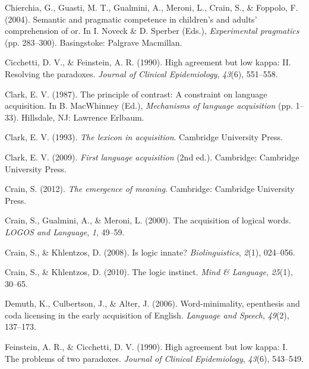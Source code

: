 \documentclass[,man,floatsintext]{apa6}
\begin{document}
\leavevmode\hypertarget{ref-chierchia2004semantic}{}%
Chierchia, G., Guasti, M. T., Gualmini, A., Meroni, L., Crain, S., \& Foppolo, F. (2004). Semantic and pragmatic competence in children's and adults' comprehension of or. In I. Noveck \& D. Sperber (Eds.), \emph{Experimental pragmatics} (pp. 283--300). Basingstoke: Palgrave Macmillan.

\leavevmode\hypertarget{ref-cicchetti1990high}{}%
Cicchetti, D. V., \& Feinstein, A. R. (1990). High agreement but low kappa: II. Resolving the paradoxes. \emph{Journal of Clinical Epidemiology}, \emph{43}(6), 551--558.

\leavevmode\hypertarget{ref-clark1987principle}{}%
Clark, E. V. (1987). The principle of contrast: A constraint on language acquisition. In B. MacWhinney (Ed.), \emph{Mechanisms of language acquisition} (pp. 1--33). Hillsdale, NJ: Lawrence Erlbaum.

\leavevmode\hypertarget{ref-clark1993lexicon}{}%
Clark, E. V. (1993). \emph{The lexicon in acquisition}. Cambridge University Press.

\leavevmode\hypertarget{ref-clark2009first}{}%
Clark, E. V. (2009). \emph{First language acquisition} (2nd ed.). Cambridge: Cambridge University Press.

\leavevmode\hypertarget{ref-crain2012emergence}{}%
Crain, S. (2012). \emph{The emergence of meaning}. Cambridge: Cambridge University Press.

\leavevmode\hypertarget{ref-crain2000acquisition}{}%
Crain, S., Gualmini, A., \& Meroni, L. (2000). The acquisition of logical words. \emph{LOGOS and Language}, \emph{1}, 49--59.

\leavevmode\hypertarget{ref-crain2008logic}{}%
Crain, S., \& Khlentzos, D. (2008). Is logic innate? \emph{Biolinguistics}, \emph{2}(1), 024--056.

\leavevmode\hypertarget{ref-crain2010logic}{}%
Crain, S., \& Khlentzos, D. (2010). The logic instinct. \emph{Mind \& Language}, \emph{25}(1), 30--65.

\leavevmode\hypertarget{ref-demuth2006word}{}%
Demuth, K., Culbertson, J., \& Alter, J. (2006). Word-minimality, epenthesis and coda licensing in the early acquisition of English. \emph{Language and Speech}, \emph{49}(2), 137--173.

\leavevmode\hypertarget{ref-feinstein1990high}{}%
Feinstein, A. R., \& Cicchetti, D. V. (1990). High agreement but low kappa: I. The problems of two paradoxes. \emph{Journal of Clinical Epidemiology}, \emph{43}(6), 543--549.
\end{document}
